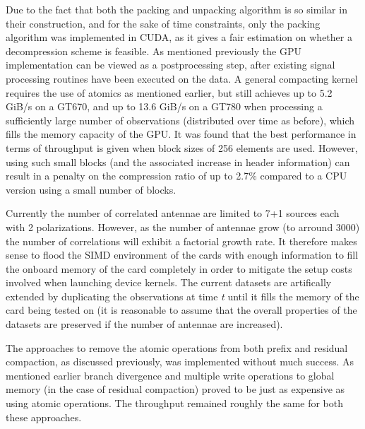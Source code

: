   Due to the fact that both the packing and unpacking algorithm is so similar in their construction, and for the sake of time constraints, only the packing algorithm was implemented in CUDA, as it 
  gives a fair estimation on whether a decompression scheme is feasible. As mentioned previously the GPU implementation can be viewed as a postprocessing step, after existing signal processing 
  routines have been executed on the data. A general compacting kernel requires the use of atomics as mentioned earlier, but still achieves up to 5.2 GiB/s on a GT670, and up to 13.6 GiB/s on a 
  GT780 when processing a sufficiently large number of observations (distributed over time as before), which fills the memory capacity of the GPU. It was found that the best performance in terms 
  of throughput is given when block sizes of 256 elements are used. However, using such small blocks (and the associated increase in header information) can result in a penalty on the compression 
  ratio of up to 2.7\% compared to a CPU version using a small number of blocks.
  
  Currently the number of correlated antennae are limited to 7+1 sources each with 2 polarizations. However, as the number of antennae grow (to arround 3000) the number of correlations will exhibit 
  a factorial growth rate. It therefore makes sense to flood the SIMD environment of the cards with enough information to fill the onboard memory of the card completely in order to mitigate the setup 
  costs involved when launching device kernels. The current datasets are artifically extended by duplicating the observations at time \textit{t} until it fills the memory of the card being tested on 
  (it is reasonable to assume that the overall properties of the datasets are preserved if the number of antennae are increased).
  
  The approaches to remove the atomic operations from both prefix and residual compaction, as discussed previously, was implemented without much success. As mentioned earlier branch divergence and multiple
  write operations to global memory (in the case of residual compaction) proved to be just as expensive as using atomic operations. The throughput remained roughly the same for both these approaches.
  
